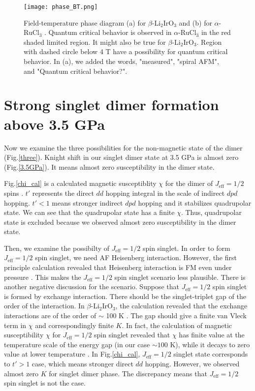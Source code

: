\documentclass[a4,10.5pt]{report}
\begin{document}
\begin{figure}
  \centering
  \texttt{[image: phase\_BT.png]}
  \caption{Field-temperature phase diagram (a) for $\beta$-Li$_2$IrO$_3$ \cite{ruiz2017correlated}
  and (b) for $\alpha$-RuCl$_3$ \cite{kasahara2018majorana}.
  Quantum critical behavior is observed in $\alpha$-RuCl$_3$ in the red shaded limited region.
  It might also be true for $\beta$-Li$_2$IrO$_3$.
  Region with dashed circle below 4 T have a possibility for quantum critical behavior.
  In (a), we added the words, "measured", "spiral AFM", and "Quantum critical behavior?".} 
  \label{phase_BT}
\end{figure}

\section{Strong singlet dimer formation above 3.5 GPa}
Now we examine the three possibilities for the non-magnetic state of the dimer (Fig.\ref{three}).
Knight shift in our singlet dimer state at 3.5 GPa is almost zero (Fig.\ref{3.5GPa}).
It means almost zero susceptibility in the dimer state.

Fig.\ref{chi_cal} is a calculated magnetic susceptiblity $\chi$ for the dimer of $J_{\mathrm{eff}} = 1/2$ spins \cite{Nasu2014}.
$t'$ represents the direct $dd$ hopping integral in the scale of indirect $dpd$ hopping. 
$t' < 1$ means stronger indirect $dpd$ hopping and it stabilizes quadrupolar state.
We can see that the quadrupolar state has a finite $\chi$.
Thus, quadrupolar state is excluded because we observed almost zero susceptibility in the dimer state.

Then, we examine the possibilty of $J_{\mathrm{eff}} = 1/2$ spin singlet.
In order to form $J_{\mathrm{eff}} = 1/2$ spin singlet, we need AF Heisenberg interaction.
However, the first principle calculation revealed that Heisenberg interaction is FM even under pressure \cite{Yadav2018, Kim2016}.
This makes the $J_{\mathrm{eff}} = 1/2$ spin singlet scenario less plausible.
There is another negative discussion for the scenario.
Suppose that $J_{\mathrm{eff}} = 1/2$ spin singlet is formed by exchange interaction.
There should be the singlet-triplet gap of the order of the interaction. 
In $\beta$-Li$_2$IrO$_3$, the calculation revealed that the exchange interactions are of the order of $\sim$ 100 K \cite{Yadav2018}. 
The gap should give a finite van Vleck term in $\chi$ and correspondingly finite $K$.
In fact, the calculation of magnetic susceptibility $\chi$ for $J_{\mathrm{eff}} = 1/2$ spin singlet revealed that $\chi$ has finite value at the temperature scale of 
the energy gap (in our case $\sim 100$ K), while it decays to zero value at lower temperature \cite{Nasu2014}.
In Fig.\ref{chi_cal}, $J_{\mathrm{eff}} = 1/2$ singlet state corresponds to $t' > 1$ case, which means stronger direct $dd$ hopping.
However, we observed almost zero $K$ for singlet dimer phase. 
The discrepancy means that $J_{\mathrm{eff}} = 1/2$ spin singlet is not the case. 
\end{document}
